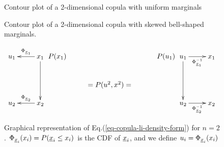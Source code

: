 \begin{figure}[!h]
\begin{floatrow}
 {\caption{Contour plot of a 2-dimensional copula
 with uniform marginals}
 \label{fig-copula1}}
 {\caption{Contour plot of a 2-dimensional copula
 with skewed bell-shaped marginals.}
 \label{fig-copula2}}
\end{floatrow}
\end{figure}





\begin{figure}[h!]
$$
\xymatrix{
u_1
&x_1\ar[l]_{\Phi_{\rvx_1}}\ar[dd]
\\
\\
u_2
&x_2\ar[l]_{\Phi_{\rvx_2}}
}
\xymatrix{P(x_1)
\\
&=P(u^2, x^2)=&}
\xymatrix{P(u_1)
\\}
\xymatrix{
u_1\ar[dd]\ar[r]_{\Phi_{\rvx_1}^{-1}}
&x_1
\\
\\
u_2\ar[r]_{\Phi_{\rvx_2}^{-1}}
&x_2
}
$$
\caption{Graphical representation
of Eq.(\ref{eq-copula-li-density-form}) for $n=2$.
$\Phi_{
{\underline{x}}_i}(x_i) = P({\underline{x}}_i\leq x_i)$
is the CDF of ${\underline{x}}_i$,
and we define
$u_i = \Phi_{{\underline{x}}_i}(x_i)$}
\label{fig-copula-li-bnet}
\end{figure}

